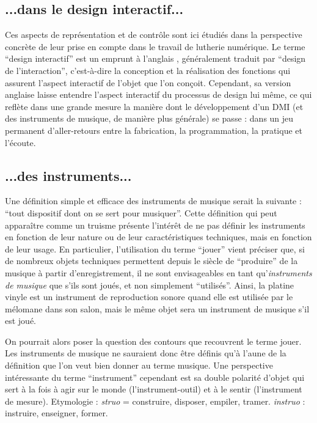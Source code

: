 \subsection*{...dans le design interactif...}

\noindent Ces aspects de représentation et de contrôle sont ici étudiés dans la perspective concrète de leur prise en compte dans le travail de lutherie numérique. Le terme ``design interactif'' est un emprunt à l'anglais , généralement traduit par ``design de l'interaction'', c'est-à-dire la conception et la réalisation des fonctions qui assurent l'aspect interactif de l'objet que l'on conçoit. Cependant, sa version anglaise laisse entendre l'aspect interactif du processus de design lui même, ce qui reflète dans une grande mesure la manière dont le développement d'un \gls{DMI} (et des instruments de musique, de manière plus générale) se passe : dans un jeu permanent d'aller-retours entre la fabrication, la programmation, la pratique et l'écoute.

\subsection*{...des instruments...}

\noindent Une définition simple et efficace des instruments de musique serait la suivante : ``tout dispositif dont on se sert pour musiquer''. Cette définition qui peut apparaître comme un truisme présente l'intérêt de ne pas définir les instruments en fonction de leur nature ou de leur caractéristiques techniques, mais en fonction de leur usage. En particulier, l'utilisation du terme ``jouer'' vient préciser que, si de nombreux objets techniques permettent depuis le siècle de ``produire'' de la musique à partir d'enregistrement, il ne sont envisageables en tant qu'\textit{instruments de musique} que s'ils sont joués, et non simplement ``utilisés''. Ainsi, la platine vinyle est un instrument de reproduction sonore quand elle est utilisée par le mélomane dans son salon, mais le même objet sera un instrument de musique s'il est joué.

On pourrait alors poser la question des contours que recouvrent le terme jouer.
Les instruments de musique ne sauraient donc être définis qu'à l'aune de la définition que l'on veut bien donner au terme musique. Une perspective intéressante du terme ``instrument'' cependant est sa double polarité d'objet qui sert à la fois à agir sur le monde (l'instrument-outil) et à le sentir (l'instrument de mesure).
Etymologie : \textit{struo} = construire, disposer, empiler, tramer.  \textit{instruo} : instruire, enseigner, former.

